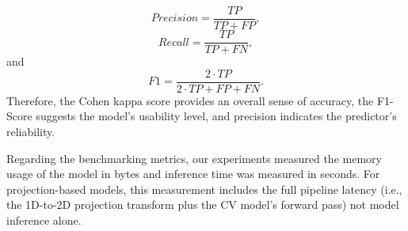 \documentclass[final,3p,times,twocolumn]{elsarticle}
\begin{document}
\begin{equation} \label{eq:Precision}
Precision = \frac{TP}{TP+FP},
\end{equation}
\begin{equation} \label{eq:Recall}
Recall = \frac{TP}{TP+FN},
\end{equation}
and
\begin{equation} \label{eq:F1-Score}
F1 = \frac{2 \cdot TP}{2 \cdot TP + FP + FN}.
\end{equation}
Therefore, the Cohen kappa score provides an overall sense of accuracy, the F1-Score suggests the model's usability level, and precision indicates the predictor's reliability.

\begin{table}[h!]
    \centering
    \caption[Binary classification confusion matrix]{Binary classification confusion matrix, where each cell resulting from the intersection between the $i$-th line and the $j$-th colum correspond to the amount of data which was predicted as the $i$-th line label and had the $j$-th column label as the true value.}
    \label{tab:experimentos:confusion_matrix}
\end{table}

Regarding the benchmarking metrics, our experiments measured the memory usage of the model in bytes and inference time was measured in seconds. For projection-based models, this measurement includes the full pipeline latency (i.e., the 1D-to-2D projection transform plus the CV model's forward pass) not model inference alone. 
\end{document}
